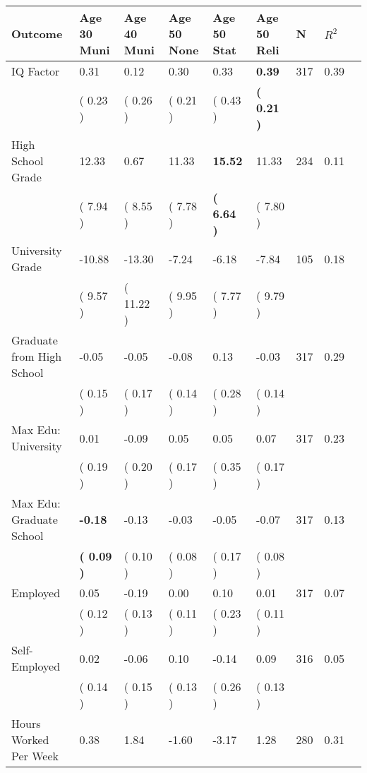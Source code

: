 \begin{tabular}{L{6.2cm} C{1.8cm} C{1.8cm} C{1.8cm} C{1.8cm} C{1.8cm} C{1.8cm} C{0.3cm} C{0.3cm}}
\toprule
 \textbf{Outcome} & \textbf{Age 30 Muni} & \textbf{Age 40 Muni} & \textbf{Age 50 None} & \textbf{Age 50 Stat} & \textbf{Age 50 Reli} & \textbf{N} & \textbf{$ R^2$} \\
\midrule
IQ Factor &      0.31 &      0.12 &      0.30 &      0.33 & \textbf{     0.39}  & 317 &       0.39 \\ 
 & (     0.23 ) & (     0.26 ) & (     0.21 ) & (     0.43 ) & \textbf{(     0.21 )}  & \\
High School Grade &     12.33 &      0.67 &     11.33 & \textbf{    15.52} &     11.33  & 234 &       0.11 \\ 
 & (     7.94 ) & (     8.55 ) & (     7.78 ) & \textbf{(     6.64 )} & (     7.80 )  & \\
University Grade &    -10.88 &    -13.30 &     -7.24 &     -6.18 &     -7.84  & 105 &       0.18 \\ 
 & (     9.57 ) & (    11.22 ) & (     9.95 ) & (     7.77 ) & (     9.79 )  & \\
Graduate from High School &     -0.05 &     -0.05 &     -0.08 &      0.13 &     -0.03  & 317 &       0.29 \\ 
 & (     0.15 ) & (     0.17 ) & (     0.14 ) & (     0.28 ) & (     0.14 )  & \\
Max Edu: University &      0.01 &     -0.09 &      0.05 &      0.05 &      0.07  & 317 &       0.23 \\ 
 & (     0.19 ) & (     0.20 ) & (     0.17 ) & (     0.35 ) & (     0.17 )  & \\
Max Edu: Graduate School & \textbf{    -0.18} &     -0.13 &     -0.03 &     -0.05 &     -0.07  & 317 &       0.13 \\ 
 & \textbf{(     0.09 )} & (     0.10 ) & (     0.08 ) & (     0.17 ) & (     0.08 )  & \\
Employed &      0.05 &     -0.19 &      0.00 &      0.10 &      0.01  & 317 &       0.07 \\ 
 & (     0.12 ) & (     0.13 ) & (     0.11 ) & (     0.23 ) & (     0.11 )  & \\
Self-Employed &      0.02 &     -0.06 &      0.10 &     -0.14 &      0.09  & 316 &       0.05 \\ 
 & (     0.14 ) & (     0.15 ) & (     0.13 ) & (     0.26 ) & (     0.13 )  & \\
Hours Worked Per Week &      0.38 &      1.84 &     -1.60 &     -3.17 &      1.28  & 280 &       0.31 \\ 

\end{tabular}
